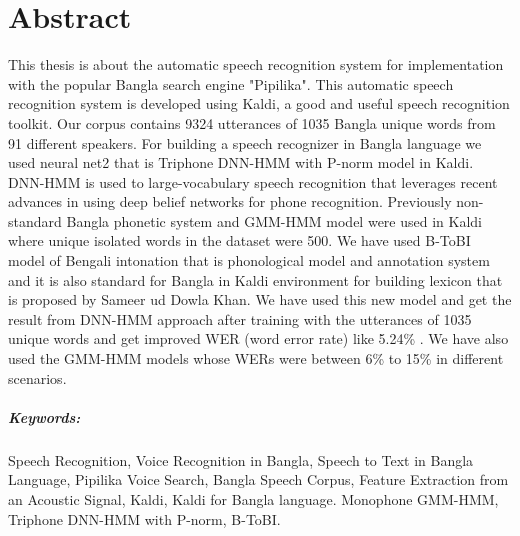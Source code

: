 \documentclass{standalone}
\begin{document}
\chapter*{Abstract}
This thesis is about the automatic speech recognition system for implementation with the popular Bangla search engine "Pipilika". This automatic speech recognition system is developed using Kaldi, a good and useful speech recognition toolkit. Our corpus contains 9324 utterances of 1035 Bangla unique words from 91 different speakers. For building a speech recognizer in Bangla language we used neural net2 that is Triphone DNN-HMM with P-norm model in Kaldi. DNN-HMM is used to large-vocabulary speech recognition that leverages recent advances in using deep belief networks for phone recognition. Previously non-standard Bangla phonetic system and GMM-HMM model were used in Kaldi where unique isolated words in the dataset were 500. We have used B-ToBI model of Bengali intonation that is phonological model and annotation system and it is also standard for Bangla in Kaldi environment for building lexicon that is proposed by Sameer ud Dowla Khan. We have used this new model and get the result from DNN-HMM approach after training with the utterances of 1035 unique words and get improved WER (word error rate) like 5.24\% .
We have also used the GMM-HMM models whose WERs were between 6\% to 15\% in different scenarios.
 

\paragraph*{Keywords:}  Speech Recognition, Voice Recognition in Bangla, Speech to Text in Bangla
Language, Pipilika Voice Search, Bangla Speech Corpus, Feature Extraction from an Acoustic
Signal, Kaldi, Kaldi for Bangla language. Monophone GMM-HMM, Triphone DNN-HMM with P-norm, B-ToBI. 
\end{document}
